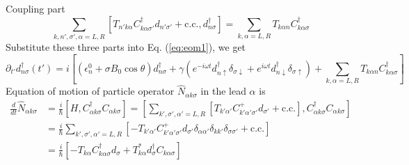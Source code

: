 \documentclass[11pt,a4paper]{article}
\begin{document}
Coupling part
\begin{equation}
\sum_{k, n',\sigma', \alpha=L, R}\left[T_{n'k \alpha} C_{k \alpha \sigma'}^{\dag} d_{n'\sigma'}+\mathrm{c.c.}, d_{n\sigma}^{\dag}\right] = \sum_{k, \alpha=L, R}T_{k \alpha n} C_{k \alpha \sigma}^{\dag}
\label{eq:part3}
\end{equation}
Substitute these three parts into Eq. (\ref{eq:eom1}), we get
\begin{equation}
\partial_{t'} d_{n\sigma}^{\dag}(t') = i[(\epsilon_{n}^{0}+\sigma B_{0} \cos \theta) d_{n\sigma}^{\dag} + \gamma(e^{-i \omega t} d_{n\uparrow}^{\dag} \delta_{\sigma\downarrow} + e^{i \omega t} d_{n\downarrow}^{\dag} \delta_{\sigma\uparrow}) + \sum_{k, \alpha=L, R}T_{k \alpha n} C_{k \alpha \sigma}^{\dag}]
\end{equation}
Equation of motion of particle operator $\hat{N}_{\alpha k\sigma}$ in the lead $\alpha$ is
\begin{equation}
\begin{split}
\frac{d}{dt}\hat{N}_{\alpha k\sigma} &= \frac{i}{\hbar}[H, C_{\alpha k\sigma}^{\dag}C_{\alpha k\sigma}] = \left[\sum_{k', \sigma', \alpha'=L, R}\left[T_{k' \alpha'} C_{k' \alpha' \sigma'}^{+} d_{\sigma'}+\mathrm{c.c.}\right], C_{\alpha k\sigma}^{\dag}C_{\alpha k\sigma}\right]\\
&=\frac{i}{\hbar}\sum_{k', \sigma', \alpha'=L, R}\left[ -T_{k' \alpha'} C_{k' \alpha' \sigma'}^{+} d_{\sigma'}\delta_{\alpha\alpha'}\delta_{kk'}\delta_{\sigma\sigma'}+\mathrm{c.c.}\right]\\
&=\frac{i}{\hbar}[-T_{k \alpha} C_{k \alpha \sigma}^{\dag} d_{\sigma} + T_{k \alpha}^{*} d_{\sigma}^{\dag}C_{k \alpha \sigma}]
\end{split}
\end{equation}
\end{document}
